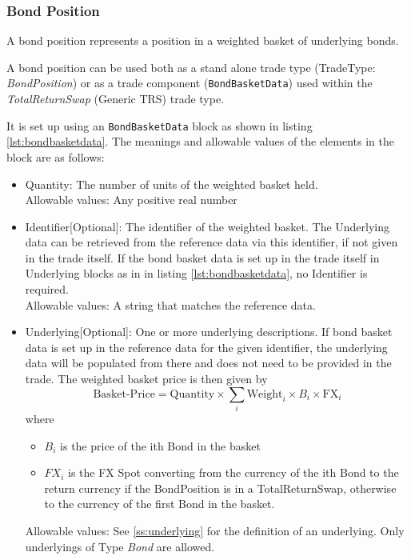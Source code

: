 \subsubsection{Bond Position}
\label{ss:bond_position}

A bond position represents a position in a weighted basket of underlying bonds.

A bond position can be used both as a stand alone trade type (TradeType: \emph{BondPosition}) or as a trade component ({\tt BondBasketData}) used within the \emph{TotalReturnSwap} (Generic TRS) trade type.

It is set up using an {\tt BondBasketData} block as shown in listing \ref{lst:bondbasketdata}. The meanings and allowable
values of the elements in the block are as follows:

\begin{itemize}
\item Quantity: The number of units of the weighted basket held.\\
  Allowable values: Any positive real number
\item Identifier[Optional]: The identifier of the weighted basket. The Underlying data can be retrieved from the reference data
  via this identifier, if not given in the trade itself. If the bond basket data is set up in the trade itself in Underlying blocks as in in listing \ref{lst:bondbasketdata}, no Identifier is required. \\
    Allowable values: A string that matches the reference data.
\item Underlying[Optional]: One or more underlying descriptions. If bond basket data is set up in the reference data for the given identifier, the underlying data will be populated from there and does not need to be provided in the trade. The weighted basket price is then given by\\
  $$\text{Basket-Price} = \text{Quantity} \times \sum_i \text{Weight}_i \times B_i \times \text{FX}_i$$
  where
  \begin{itemize}
  \item $B_i$ is the price of the ith Bond in the basket
  \item $FX_i$ is the FX Spot converting from the currency of the ith Bond  to the return currency if the BondPosition is in a TotalReturnSwap, otherwise to the currency of the first Bond in the basket. 
  \end{itemize}

  Allowable values: See \ref{ss:underlying} for the definition of an underlying. Only underlyings of Type \emph{Bond} are allowed.
\end{itemize}

